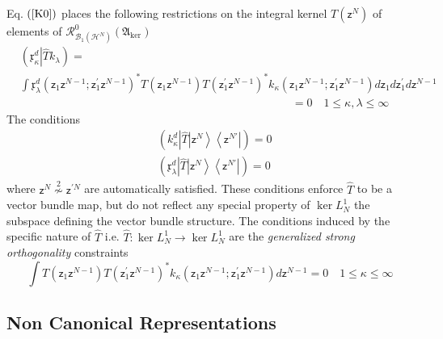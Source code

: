 \documentclass[aps,preprint]{revtex4}%
\begin{document}
Eq. $\left(  \ref{K0}\right)  $ places the following restrictions on the
integral kernel $T\left(  \mathsf{z}^{N}\right)  $ of elements of
$\mathcal{R}_{\mathcal{B}_{1}\left(  \mathcal{H}^{N}\right)  }^{0}\left(
\mathfrak{A}_{\ker}\right)  $
\begin{align}
&  \left(  \mathfrak{x}_{\kappa}^{d}\left\vert \hat{T}\right.  k_{\lambda
}\right)  =\nonumber\\
&
{\displaystyle\int}
\mathfrak{x}_{\lambda}^{d}\left(  \mathsf{z}_{1}\mathsf{z}^{N-1}%
;\mathsf{z}_{1}^{\prime}\mathsf{z}^{N-1}\right)  ^{\ast}T\left(
\mathsf{z}_{1}\mathsf{z}^{N-1}\right)  T\left(  \mathsf{z}_{1}^{\prime
}\mathsf{z}^{N-1}\right)  ^{\ast}k_{\kappa}\left(  \mathsf{z}_{1}%
\mathsf{z}^{N-1};\mathsf{z}_{1}^{\prime}\mathsf{z}^{N-1}\right)
d\mathsf{z}_{1}d\mathsf{z}_{1}^{\prime}d\mathsf{z}^{N-1}\nonumber\\
&  \left.  {}\right.  \qquad\qquad\qquad\qquad\qquad\qquad\qquad\qquad
\qquad\qquad\qquad\qquad=0\quad1\leq\kappa,\lambda\leq\infty
\end{align}
The conditions
\begin{align}
&  \left(  k_{\kappa}^{d}\left\vert \hat{T}\right.  \left\vert \mathsf{z}%
^{N}\right\rangle \left\langle \mathsf{z}^{N\prime}\right\vert \right)
=0\nonumber\\
&  \left(  \mathfrak{x}_{\lambda}^{d}\left\vert \hat{T}\right.  \left\vert
\mathsf{z}^{N}\right\rangle \left\langle \mathsf{z}^{N\prime}\right\vert
\right)  =0
\end{align}
where $\mathsf{z}^{N}\overset{2}{\nsim}\mathsf{z}^{\prime N}$ are
automatically satisfied. These conditions enforce $\hat{T}$ to be a vector
bundle map, but do not reflect any special property of $\ker L_{N}^{1}$ the
subspace defining the vector bundle structure. The conditions induced by the
specific nature of $\hat{T}$ i.e. $\hat{T}:\ker L_{N}^{1}\rightarrow\ker
L_{N}^{1}$ are the \textit{generalized strong orthogonality} constraints
\begin{equation}
\int T\left(  \mathsf{z}_{1}\mathsf{z}^{N-1}\right)  T\left(  \mathsf{z}%
_{1}^{\prime}\mathsf{z}^{N-1}\right)  ^{\ast}k_{\kappa}\left(  \mathsf{z}%
_{1}\mathsf{z}^{N-1};\mathsf{z}_{1}^{\prime}\mathsf{z}^{N-1}\right)
d\mathsf{z}^{N-1}=0\quad1\leq\kappa\leq\infty
\end{equation}


\subsection{Non Canonical Representations \label{noncanrep}}
\end{document}
